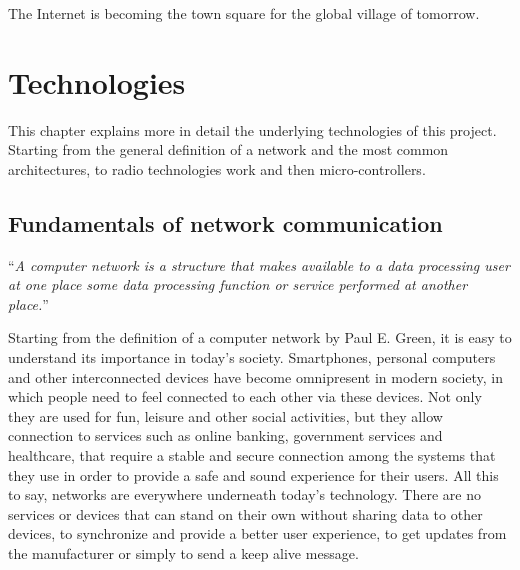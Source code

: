 
\begin{savequote}[70mm]
	The Internet is becoming the town square for the global village of tomorrow.
\end{savequote}


\chapter{Technologies}\label{chapter:technologies}
	
	This chapter explains more in detail the underlying technologies of this project.
	Starting from the general definition of a network and the most common architectures, to radio technologies work and then micro-controllers.
	
\section{Fundamentals of network communication}
	
	\begin{center}
		\begin{minipage}[H]{0.9\columnwidth}
			\begin{center}
				``\textit{A computer network is a structure that makes available to a data processing user at one place some data processing function or service performed at another place.}''~\cite{nla.cat-vn252493}
			\end{center}
		\end{minipage}
	\end{center}
	
	Starting from the definition of a computer network by Paul E. Green, it is easy to understand its importance in today's society.
	Smartphones, personal computers and other interconnected devices have become omnipresent in modern society, in which people need to feel connected to each other via these devices.
	Not only they are used for fun, leisure and other social activities, but they allow connection to services such as online banking, government services and healthcare, that require a stable and secure connection among the systems that they use in order to provide a safe and sound experience for their users.
	All this to say, networks are everywhere underneath today's technology.
	There are no services or devices that can stand on their own without sharing data to other devices, to synchronize and provide a better user experience, to get updates from the manufacturer or simply to send a keep alive message.
	

